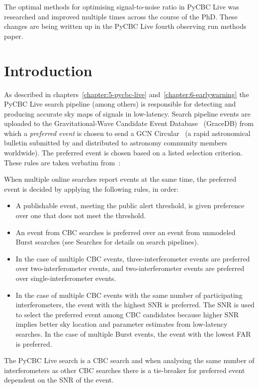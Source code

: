 
The optimal methods for optimising signal-to-noise ratio in PyCBC Live was researched and improved multiple times across the course of the PhD. These changes are being written up in the PyCBC Live fourth observing run methods paper.

\section{\label{7:sec:introduction}Introduction}


As described in chapters~\ref{chapter:5-pycbc-live} and~\ref{chapter:6-earlywarning} the PyCBC Live search pipeline (among others) is responsible for detecting and producing accurate sky maps of \gwadj signals in low-latency. Search pipeline events are uploaded to the Gravitational-Wave Candidate Event Database~\cite{ligo_gracedb:2024} (GraceDB) from which a \textit{preferred event} is chosen to send a GCN Circular~\cite{gcn_circulars:2024} (a rapid astronomical bulletin submitted by and distributed to astronomy community members worldwide). The preferred event is chosen based on a listed selection criterion. These rules are taken verbatim from~\cite{gracedb_superevent_selection}:

When multiple online searches report events at the same time, the preferred event is decided by applying the following rules, in order:
%
\begin{itemize}
    \item A publishable event, meeting the public alert threshold, is given preference over one that does not meet the threshold.
    \item An event from CBC searches is preferred over an event from unmodeled Burst searches (see Searches for details on search pipelines).
    \item In the case of multiple CBC events, three-interferometer events are preferred over two-interferometer events, and two-interferometer events are preferred over single-interferometer events.
    \item In the case of multiple CBC events with the same number of participating interferometers, the event with the highest SNR is preferred. The SNR is used to select the preferred event among CBC candidates because higher SNR implies better sky location and parameter estimates from low-latency searches. In the case of multiple Burst events, the event with the lowest FAR is preferred.
\end{itemize}
%
The PyCBC Live search is a CBC search and when analysing the same number of interferometers as other CBC searches there is a tie-breaker for preferred event dependent on the SNR of the event.

